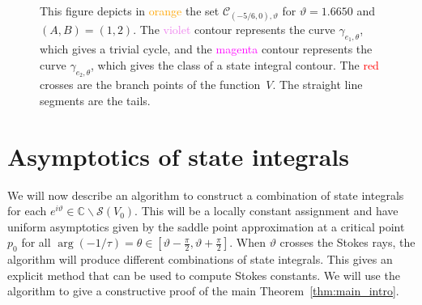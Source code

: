 \documentclass[12pt,reqno]{amsart}
\newtheorem{theorem}{Theorem}[section]
\theoremstyle{definition}
\newtheorem{proposition}[theorem]{Proposition}
\newtheorem{lemma}[theorem]{Lemma}
\def\BC{\mathbb C}
\def\calC{\mathcal C}
\def\calS{\mathcal S}
\renewcommand{\=}{\;=\;}
\begin{document}
\begin{figure}[ht]
\caption{This figure depicts in \textcolor{orange}{orange} the set $\calC_{(-5/6,0),\vartheta}$ for $\vartheta=1.6650$ and $(A,B)=(1,2)$. The \textcolor{violet}{violet} contour represents the curve $\gamma_{e_1,\theta}$, which gives a trivial cycle, and the \textcolor{magenta}{magenta} contour represents the curve $\gamma_{e_2,\theta}$, which gives the class of a state integral contour. The \textcolor{red}{red} crosses are the branch points of the function~$V$. The straight line segments are the tails.}
\label{fig:edge.thimb.41}
\end{figure}
\section{Asymptotics of state integrals}\label{sec:asymp_state_int}
We will now describe an algorithm to construct a combination of state integrals for each $e^{i\vartheta}\in\BC\backslash\calS(V_0)$. This will be a locally constant assignment and have uniform asymptotics given by the saddle point approximation at a critical point $p_0$ for all $\arg(-1/\tau)=\theta\in[\vartheta-\tfrac{\pi}{2},\vartheta+\tfrac{\pi}{2}]$. When $\vartheta$ crosses the Stokes rays, the algorithm will produce different combinations of state integrals. This gives an explicit method that can be used to compute Stokes constants. We will use the algorithm to give a constructive proof of the main Theorem~\ref{thm:main_intro}.
\end{document}
